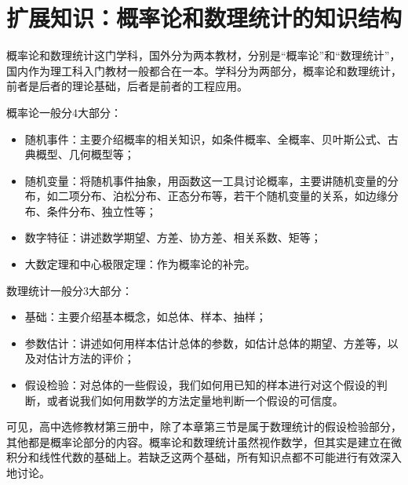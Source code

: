 \section{扩展知识：概率论和数理统计的知识结构}

概率论和数理统计这门学科，国外分为两本教材，分别是“概率论”和“数理统计”，国内作为理工科入门教材一般都合在一本。学科分为两部分，概率论和数理统计，前者是后者的理论基础，后者是前者的工程应用。

概率论一般分4大部分：
\begin{itemize}
    \item 随机事件：主要介绍概率的相关知识，如条件概率、全概率、贝叶斯公式、古典概型、几何概型等；
    \item 随机变量：将随机事件抽象，用函数这一工具讨论概率，主要讲随机变量的分布，如二项分布、泊松分布、正态分布等，若干个随机变量的关系，如边缘分布、条件分布、独立性等；
    \item 数字特征：讲述数学期望、方差、协方差、相关系数、矩等；
    \item 大数定理和中心极限定理：作为概率论的补完。
\end{itemize}

数理统计一般分3大部分：
\begin{itemize}
    \item 基础：主要介绍基本概念，如总体、样本、抽样；
    \item 参数估计：讲述如何用样本估计总体的参数，如估计总体的期望、方差等，以及对估计方法的评价；
    \item 假设检验：对总体的一些假设，我们如何用已知的样本进行对这个假设的判断，或者说我们如何用数学的方法定量地判断一个假设的可信度。
\end{itemize}

可见，高中选修教材第三册中，除了本章第三节是属于数理统计的假设检验部分，其他都是概率论部分的内容。概率论和数理统计虽然视作数学，但其实是建立在微积分和线性代数的基础上。若缺乏这两个基础，所有知识点都不可能进行有效深入地讨论。




